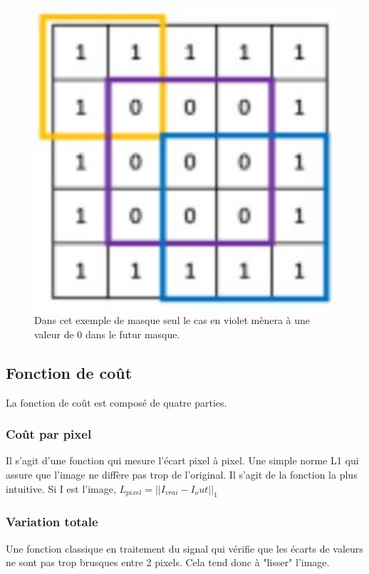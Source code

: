 \begin{figure}[!h]
    \centering
    \includegraphics[width= 400pt,valign=t]{"images/Image_inpainting/val0masque"}
    \caption{Dans cet exemple de masque seul le cas en violet mènera à une valeur de 0 dans le futur masque.}
\end{figure}


\subsection{Fonction de coût}
La fonction de coût est composé de quatre parties.
\subsubsection{Coût par pixel}
Il s'agit d'une fonction qui mesure l'écart pixel à pixel. Une simple norme L1 qui assure que l'image ne diffère pas trop de l'original. Il s'agit de la fonction la plus intuitive. Si I est l'image, $L_{pixel} = ||I_{vrai} - {I_out}||_1$
\subsubsection{Variation totale}
Une fonction classique en traitement du signal qui vérifie que les écarts de valeurs ne sont pas trop brusques entre 2 pixels. Cela tend donc à "lisser" l'image.
